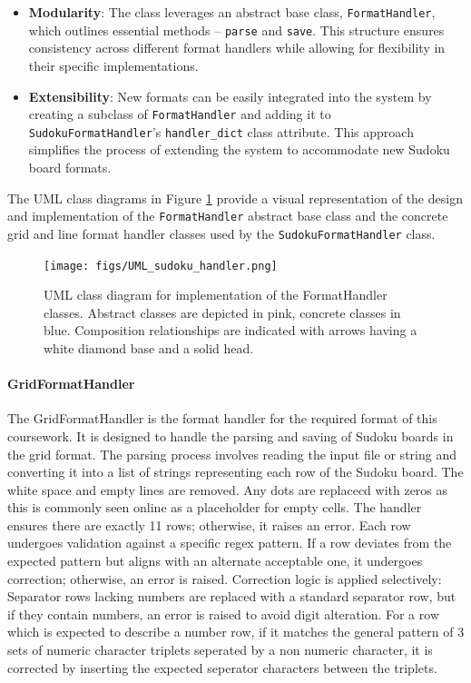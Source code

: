 \documentclass[11pt]{article}
\begin{document}
\begin{itemize}
    \item \textbf{Modularity}: The class leverages an abstract base class, \texttt{FormatHandler}, which outlines essential methods -- \texttt{parse} and \texttt{save}. This structure ensures consistency across different format handlers while allowing for flexibility in their specific implementations.
    \item \textbf{Extensibility}: New formats can be easily integrated into the system by creating a subclass of \texttt{FormatHandler} and adding it to \texttt{SudokuFormatHandler}'s \texttt{handler\_dict} class attribute. This approach simplifies the process of extending the system to accommodate new Sudoku board formats.
\end{itemize}
The UML class diagrams in Figure \ref{fig:format_handler_uml} provide a visual representation of the design and implementation of the \texttt{FormatHandler} abstract base class and the concrete grid and line format handler classes used by the \texttt{SudokuFormatHandler} class.
\begin{figure}[H]
    \centering
    \texttt{[image: figs/UML\_sudoku\_handler.png]}
    \caption{UML class diagram for implementation of the FormatHandler classes. Abstract classes are depicted in pink, concrete classes in blue. Composition relationships are indicated with arrows having a white diamond base and a solid head.}
    \label{fig:format_handler_uml}
\end{figure}


\paragraph{GridFormatHandler}
The GridFormatHandler is the format handler for the required format of this coursework. It is designed to handle the parsing and saving of Sudoku boards in the grid format. The parsing process involves reading the input file or string and converting it into a list of strings representing each row of the Sudoku board. The white space and empty lines are removed. Any dots are replacecd with zeros as this is commonly seen online as a placeholder for empty cells. The handler ensures there are exactly 11 rows; otherwise, it raises an error. Each row undergoes validation against a specific regex pattern. If a row deviates from the expected pattern but aligns with an alternate acceptable one, it undergoes correction; otherwise, an error is raised. Correction logic is applied selectively: Separator rows lacking numbers are replaced with a standard separator row, but if they contain numbers, an error is raised to avoid digit alteration. For a row which is expected to describe a number row, if it matches the general pattern of 3 sets of numeric character triplets seperated by a non numeric character, it is corrected by inserting the expected seperator characters between the triplets.
\end{document}
